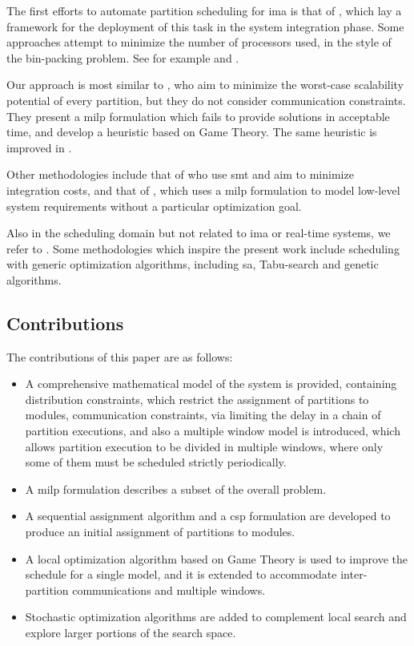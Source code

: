 \documentclass[main.tex]{subfiles}
\begin{document}
The first efforts to automate partition scheduling for \gls{ima} is that of \textcite{lee2000scheduling}, which lay a framework for the deployment of this task in the system integration phase.
Some approaches attempt to minimize the number of processors used, in the style of the bin-packing problem.
See for example \textcite{verschae2010scheduling} and \textcite{eisenbrand2010solving}.

Our approach is most similar to \textcite{al2012strictly}, who aim to minimize the worst-case scalability potential of every partition, but they do not consider communication constraints.
They present a \gls{milp} formulation which fails to provide solutions in acceptable time, and develop a heuristic based on Game Theory.
The same heuristic is improved in \textcite{pira2016line}.

Other methodologies include that of \textcite{beji2014smt} who use \gls{smt} and aim to minimize integration costs, and that of \textcite{blikstad2018optimisation}, which uses a \gls{milp} formulation to model low-level system requirements without a particular optimization goal.

Also in the scheduling domain but not related to \gls{ima} or real-time systems, we refer to \textcite{pinedo2008scheduling}.
Some methodologies which inspire the present work include scheduling with generic optimization algorithms, including \gls{sa}, Tabu-search and genetic algorithms.

\subsection{Contributions}

The contributions of this paper are as follows:
\begin{itemize}
    \item A comprehensive mathematical model of the system is provided, containing distribution constraints, which restrict the assignment of partitions to modules, communication constraints, via limiting the delay in a chain of partition executions, and also a multiple window model is introduced, which allows partition execution to be divided in multiple windows, where only some of them must be scheduled strictly periodically.
    \item A \gls{milp} formulation describes a subset of the overall problem.
    \item A sequential assignment algorithm and a \gls{csp} formulation are developed to produce an initial assignment of partitions to modules.
    \item A local optimization algorithm based on Game Theory \cite{al2012strictly} is used to improve the schedule for a single model, and it is extended to accommodate inter-partition communications and multiple windows.
    \item Stochastic optimization algorithms are added to complement local search and explore larger portions of the search space.
\end{itemize}
\end{document}
